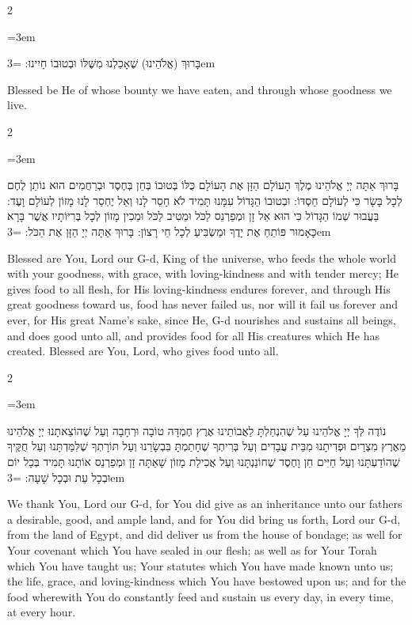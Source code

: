 \documentclass[11pt, openany]{book}
\newenvironment{bilingual}{%
  \par\vspace{4pt}%
  \begin{paracol}{2}%
}{%
  \end{paracol}%
  \par\vspace{2pt}%
}
\newenvironment{hebrewcol}{%
  \switchcolumn[1]%
  \begingroup
  \RTL
  \hebrewfont\large
  \setstretch{1.4}%
  \emergencystretch=3em
  \tolerance=9999
  \parindent=0pt\relax
}{%
  \endRTL
  \endgroup
}
\newenvironment{englishcol}{%
  \switchcolumn[0]%
  \begingroup
  \setstretch{1.4}%
  \emergencystretch=3em
  \tolerance=9999
  \normalsize
  \rightskip=0.12in\relax
}{%
  \endgroup
}
\begin{document}
\begin{bilingual}
\begin{hebrewcol}
בָּרוּךְ (אֱלֹהֵינוּ) שֶׁאָכַלְנוּ מִשֶּׁלּוֹ וּבְטוּבוֹ חָיִינוּ:
\end{hebrewcol}
\begin{englishcol}
Blessed be He of whose bounty we have eaten, and through whose goodness we live.
\end{englishcol}
\end{bilingual}
\begin{bilingual}
\begin{hebrewcol}
בָּרוּךְ אַתָּה יְיָ אֱלֹהֵינוּ מֶלֶךְ הָעוֹלָם הַזָּן אֶת הָעוֹלָם כֻּלּוֹ בְּטוּבוֹ בְּחֵן בְּחֶסֶד וּבְרַחֲמִים הוּא נוֹתֵן לֶחֶם לְכָל בָּשָׂר כִּי לְעוֹלָם חַסְדּוֹ: וּבְטוּבוֹ הַגָּדוֹל עִמָּנוּ תָּמִיד לֹא חָסֵר לָנוּ וְאַל יֶחְסַר לָנוּ מָזוֹן לְעוֹלָם וָעֶד: בַּעֲבוּר שְׁמוֹ הַגָּדוֹל כִּי הוּא אֵל זָן וּמְפַרְנֵס לַכֹּל וּמֵטִיב לַכֹּל וּמֵכִין מָזוֹן לְכָל בְּרִיּוֹתָיו אֲשֶׁר בָּרָא כָּאָמוּר פּוֹתֵחַ אֶת יָדֶךָ וּמַשְׂבִּיעַ לְכָל חַי רָצוֹן: בָּרוּךְ אַתָּה יְיָ הַזָּן אֶת הַכֹּל:
\end{hebrewcol}
\begin{englishcol}
Blessed are You, Lord our G-d, King of the universe, who feeds the whole world with your goodness, with grace, with loving-kindness and with tender mercy; He gives food to all flesh, for His loving-kindness endures forever, and through His great goodness toward us, food has never failed us, nor will it fail us forever and ever, for His great Name's sake, since He, G-d nourishes and sustains all beings, and does good unto all, and provides food for all His creatures which He has created. Blessed are You, Lord, who gives food unto all.
\end{englishcol}
\end{bilingual}
\begin{bilingual}
\begin{hebrewcol}
נוֹדֶה לְּךָ יְיָ אֱלֹהֵינוּ עַל שֶׁהִנְחַלְתָּ לַאֲבוֹתֵינוּ אֶרֶץ חֶמְדָּה טוֹבָה וּרְחָבָה וְעַל שֶׁהוֹצֵאתָנוּ יְיָ אֱלֹהֵינוּ מֵאֶרֶץ מִצְרַיִם וּפְדִיתָנוּ מִבֵּית עֲבָדִים וְעַל בְּרִיתְךָ שֶׁחָתַמְתָּ בִּבְשָׂרֵנוּ וְעַל תּוֹרָתְךָ שֶׁלִּמַּדְתָּנוּ וְעַל חֻקֶּיךָ שֶׁהוֹדַעְתָּנוּ וְעַל חַיִּים חֵן וָחֶסֶד שֶׁחוֹנַנְתָּנוּ וְעַל אֲכִילַת מָזוֹן שָׁאַתָּה זָן וּמְפַרְנֵס אוֹתָנוּ תָּמִיד בְּכָל יוֹם וּבְכָל עֵת וּבְכָל שָׁעָה:
\end{hebrewcol}
\begin{englishcol}
We thank You, Lord our G-d, for You did give as an inheritance unto our fathers a desirable, good, and ample land, and for You did bring us forth, Lord our G-d, from the land of Egypt, and did deliver us from the house of bondage; as well for Your covenant which You have sealed in our flesh; as well as for Your Torah which You have taught us; Your statutes which You have made known unto us; the life, grace, and loving-kindness which You have bestowed upon us; and for the food wherewith You do constantly feed and sustain us every day, in every time, at every hour.
\end{englishcol}
\end{bilingual}
\end{document}

